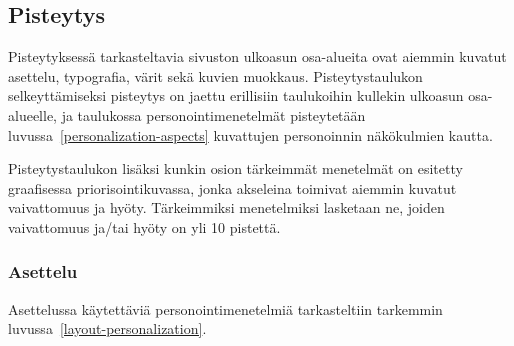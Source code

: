 \documentclass[finnish, 12pt, a4paper, elec, utf8, a-1b, online]{aaltothesis}
\begin{document}
\subsection{Pisteytys}

Pisteytyksessä tarkasteltavia sivuston ulkoasun osa-alueita ovat aiemmin
kuvatut asettelu, typografia, värit sekä kuvien muokkaus.
Pisteytystaulukon selkeyttämiseksi pisteytys on jaettu erillisiin taulukoihin
kullekin ulkoasun osa-alueelle, ja taulukossa personointimenetelmät pisteytetään
luvussa~\ref{personalization-aspects} kuvattujen personoinnin näkökulmien
kautta.

Pisteytystaulukon lisäksi kunkin osion tärkeimmät menetelmät on esitetty
graafisessa priorisointikuvassa, jonka akseleina toimivat aiemmin kuvatut
vaivattomuus ja hyöty. Tärkeimmiksi menetelmiksi lasketaan ne, joiden
vaivattomuus ja/tai hyöty on yli 10 pistettä.

\subsubsection{Asettelu}

Asettelussa käytettäviä personointimenetelmiä tarkasteltiin tarkemmin
luvussa~\ref{layout-personalization}.
\end{document}

